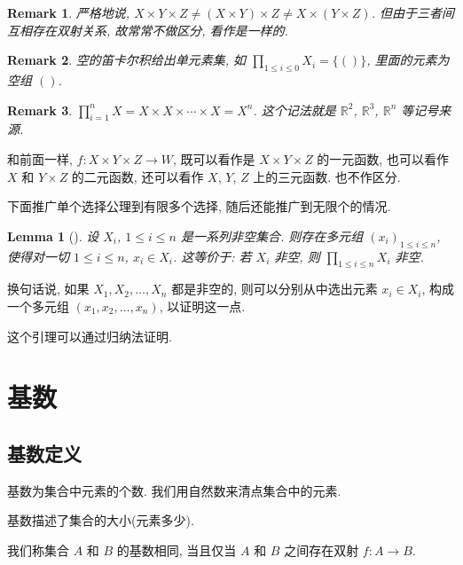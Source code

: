 \documentclass[UTF8]{ctexart}
\theoremstyle{mystyle}
\newtheorem{lemma}{Lemma}[section]
\theoremstyle{myremark}
\newtheorem*{remark}{Remark}
\theoremstyle{plain}
\newcommand{\R}{\mathbb R}
\newcommand{\set}[1]{\{#1\}}
\begin{document}
\begin{remark}
    严格地说, $ X \times Y \times Z \neq (X \times Y) \times Z \neq X \times (Y \times Z) $. 但由于三者间互相存在双射关系, 故常常不做区分, 看作是一样的.
\end{remark}

\begin{remark}
    空的笛卡尔积给出单元素集, 如 $ \prod_{1 \leqslant i \leqslant 0} X_i = \set{()} $, 里面的元素为空组 $ () $. 
\end{remark}

\begin{remark}
    $ \prod_{i = 1}^n X = X \times X \times \cdots \times X = X^n $. 这个记法就是 $ \R^2 $, $ \R^3 $, $ \R^n $ 等记号来源.
\end{remark}

和前面一样, $ f \colon X \times Y \times Z \to W $, 既可以看作是 $ X \times Y \times Z $ 的一元函数, 也可以看作 $ X $ 和 $ Y \times Z $ 的二元函数, 还可以看作 $ X $, $ Y $, $ Z $ 上的三元函数. 也不作区分.

下面推广单个选择公理到有限多个选择, 随后还能推广到无限个的情况.
\begin{lemma}[]
    设 $ X_i $, $ 1 \leqslant i \leqslant n $ 是一系列非空集合. 则存在多元组 $ (x_i)_{1 \leqslant i \leqslant n} $, 使得对一切 $ 1 \leqslant i \leqslant n $, $ x_i \in X_i $. 这等价于: 若 $ X_i $ 非空, 则 $ \displaystyle \prod_{1 \leqslant i \leqslant n} X_i $ 非空. 
\end{lemma}

换句话说, 如果 $ X_1, X_2, \dots, X_n $ 都是非空的, 则可以分别从中选出元素 $ x_i \in X_i $, 构成一个多元组 $ (x_1, x_2, \dots, x_n) $, 以证明这一点.

这个引理可以通过归纳法证明. 


\section{基数}
\subsection{基数定义}
\begin{definition}
    基数为集合中元素的个数. 我们用自然数来清点集合中的元素.
\end{definition}

基数描述了集合的大小(元素多少). 

\begin{definition}
    我们称集合 $ A $ 和 $ B $ 的基数相同, 当且仅当 $ A $ 和 $ B $ 之间存在双射 $ f \colon A \to B $.
\end{definition}
\end{document}

